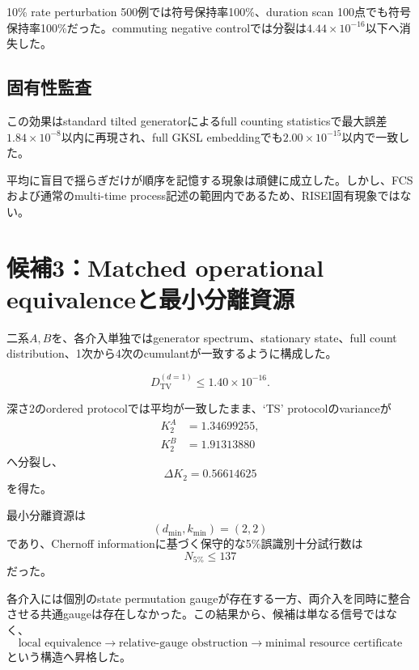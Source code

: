 \documentclass[11pt,a4paper,uplatex,dvipdfmx]{bxjsarticle}
\theoremstyle{remark}
\begin{document}
10\% rate perturbation 500例では符号保持率100\%、duration scan 100点でも符号保持率100\%だった。commuting negative controlでは分裂は$4.44\times10^{-16}$以下へ消失した。

\subsection{固有性監査}

この効果はstandard tilted generatorによるfull counting statisticsで最大誤差$1.84\times10^{-8}$以内に再現され、full GKSL embeddingでも$2.00\times10^{-15}$以内で一致した。

\begin{warningbox}[判定]
平均に盲目で揺らぎだけが順序を記憶する現象は頑健に成立した。しかし、FCSおよび通常のmulti-time process記述の範囲内であるため、RISEI固有現象ではない。
\end{warningbox}

\section{候補3：Matched operational equivalenceと最小分離資源}

二系$A,B$を、各介入単独ではgenerator spectrum、stationary state、full count distribution、1次から4次のcumulantが一致するように構成した。

\begin{equation}
D_{\mathrm{TV}}^{(d=1)}
\le1.40\times10^{-16}.
\end{equation}

深さ2のordered protocolでは平均が一致したまま、`TS' protocolのvarianceが
\begin{align}
K_2^A&=1.34699255,\\
K_2^B&=1.91313880
\end{align}
へ分裂し、
\begin{equation}
\boxed{\Delta K_2=0.56614625}
\end{equation}
を得た。

最小分離資源は
\begin{equation}
\boxed{(d_{\min},k_{\min})=(2,2)}
\end{equation}
であり、Chernoff informationに基づく保守的な5\%誤識別十分試行数は
\begin{equation}
\boxed{N_{5\%}\le137}
\end{equation}
だった。

各介入には個別のstate permutation gaugeが存在する一方、両介入を同時に整合させる共通gaugeは存在しなかった。この結果から、候補は単なる信号ではなく、
\begin{equation}
\text{local equivalence}
\to
\text{relative-gauge obstruction}
\to
\text{minimal resource certificate}
\end{equation}
という構造へ昇格した。
\end{document}

